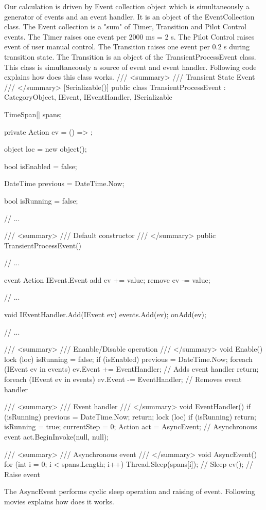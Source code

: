 \documentclass[10pt,journal,compsoc]{IEEEtran}
\begin{document}
Our calculation is driven by Event collection object which is simultaneously a generator of events and an event handler. It is an object of the {EventCollection} class. The Event collection is a "sum" of Timer, Transition and Pilot Control events. The Timer raises one event per 2000 ms = 2 s. The Pilot Control raises event of user manual control. The Transition raises one event per 0.2 s during transition state. The Transition is an object of the TransientProcessEvent class. This class is simultaneously a source of event and event handler. Following code explains how does this class works.
/// <summary>
/// Transient State Event
/// </summary>
[Serializable()]
public class TransientProcessEvent : CategoryObject, IEvent, IEventHandler, ISerializable
{
	
	TimeSpan[] spans;
	
	private Action ev = () => { };
	
	object loc = new object();
	
	bool isEnabled = false;
	
	DateTime previous = DateTime.Now;
	
	bool isRunning = false;
	
	// ...
	
	
	/// <summary>
	/// Default constructor
	/// </summary>
	public TransientProcessEvent()
	{
	}
	
	// ...
	
	
	event Action IEvent.Event
	{
		add { ev += value; }
		remove { ev -= value; }
	}
	
	// ...
	
	
	void IEventHandler.Add(IEvent ev)
	{
		events.Add(ev);
		onAdd(ev);
	}
	
	// ...
	
	/// <summary>
	/// Enanble/Disable operation
	/// </summary>
	void Enable()
	{
		lock (loc)
		{
			isRunning = false;
			if (isEnabled)
			{
				previous = DateTime.Now;
				foreach (IEvent ev in events)
				{
					ev.Event += EventHandler; // Adds event handler
				}
				return;
			}
			foreach (IEvent ev in events)
			{
				ev.Event -= EventHandler;    // Removes event handler
			}
		}
	}
	
	/// <summary>
	/// Event handler
	/// </summary>
	void EventHandler()
	{
		if (isRunning)
		{
			previous = DateTime.Now;
			return;
		}
		lock (loc)
		{
			if (isRunning)
			{
				return;
			}
			isRunning = true;
			currentStep = 0;
			Action act = AsyncEvent; // Asynchronous event
			act.BeginInvoke(null, null);
		}
	}
	
	/// <summary>
	/// Asynchronous event
	/// </summary>
	void AsyncEvent()
	{
		for (int i = 0; i < spans.Length; i++)
		{
			Thread.Sleep(spans[i]); // Sleep
			ev();                   // Raise event
		}
	}
	
	
}
The AsyncEvent performs cyclic sleep operation and raising of event. Following movies explains how does it works. 
\end{document}
